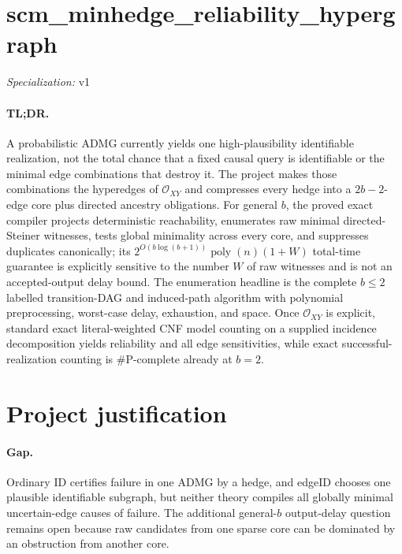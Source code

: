 \documentclass{article}
\begin{document}
\sloppy

\section*{scm\_\allowbreak{}minhedge\_\allowbreak{}reliability\_\allowbreak{}hypergraph}

\noindent\textit{Specialization:} v1\par

\paragraph{TL;DR.} A probabilistic ADMG currently yields one high-plausibility identifiable realization, not the total chance that a fixed causal query is identifiable or the minimal edge combinations that destroy it.  The project makes those combinations the hyperedges of \(\mathcal O_{XY}\) and compresses every hedge into a \(2b-2\)-edge core plus directed ancestry obligations.  For general \(b\), the proved exact compiler projects deterministic reachability, enumerates raw minimal directed-Steiner witnesses, tests global minimality across every core, and suppresses duplicates canonically; its \(2^{O(b\log(b+1))}\operatorname{poly}(n)(1+W)\) total-time guarantee is explicitly sensitive to the number \(W\) of raw witnesses and is not an accepted-output delay bound.  The enumeration headline is the complete \(b\le2\) labelled transition-DAG and induced-path algorithm with polynomial preprocessing, worst-case delay, exhaustion, and space.  Once \(\mathcal O_{XY}\) is explicit, standard exact literal-weighted CNF model counting on a supplied incidence decomposition yields reliability and all edge sensitivities, while exact successful-realization counting is \(\#\mathrm P\)-complete already at \(b=2\).

\section{Project justification}

\paragraph{Gap.} Ordinary ID certifies failure in one ADMG by a hedge, and edgeID chooses one plausible identifiable subgraph, but neither theory compiles all globally minimal uncertain-edge causes of failure.  The additional general-\(b\) output-delay question remains open because raw candidates from one sparse core can be dominated by an obstruction from another core.
\end{document}
